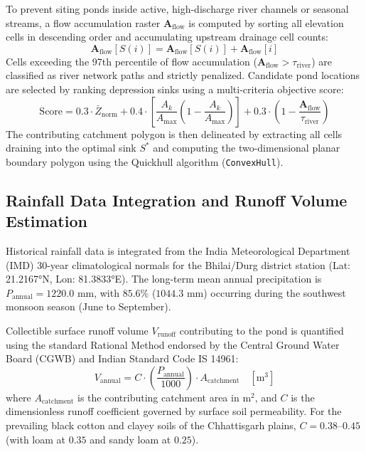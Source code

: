 \documentclass[manuscript,screen,review]{acmart}
\begin{document}
To prevent siting ponds inside active, high-discharge river channels or seasonal streams, a flow accumulation raster $\mathbf{A}_{\text{flow}}$ is computed by sorting all elevation cells in descending order and accumulating upstream drainage cell counts:
\begin{equation}
    \mathbf{A}_{\text{flow}}[S(i)] = \mathbf{A}_{\text{flow}}[S(i)] + \mathbf{A}_{\text{flow}}[i]
\end{equation}
Cells exceeding the 97th percentile of flow accumulation ($\mathbf{A}_{\text{flow}} > \tau_{\text{river}}$) are classified as river network paths and strictly penalized. Candidate pond locations are selected by ranking depression sinks using a multi-criteria objective score:
\begin{equation}
    \text{Score} = 0.3 \cdot \bar{Z}_{\text{norm}} + 0.4 \cdot \left[ \frac{A_k}{A_{\max}} \left(1 - \frac{A_k}{A_{\max}}\right) \right] + 0.3 \cdot \left( 1 - \frac{\mathbf{A}_{\text{flow}}}{\tau_{\text{river}}} \right)
\end{equation}
The contributing catchment polygon is then delineated by extracting all cells draining into the optimal sink $S^*$ and computing the two-dimensional planar boundary polygon using the Quickhull algorithm (\texttt{ConvexHull}).

\subsection{Rainfall Data Integration and Runoff Volume Estimation}
Historical rainfall data is integrated from the India Meteorological Department (IMD) 30-year climatological normals for the Bhilai/Durg district station (Lat: 21.2167°N, Lon: 81.3833°E). The long-term mean annual precipitation is $P_{\text{annual}} = 1220.0\text{ mm}$, with $85.6\%$ ($1044.3\text{ mm}$) occurring during the southwest monsoon season (June to September). 

Collectible surface runoff volume $V_{\text{runoff}}$ contributing to the pond is quantified using the standard Rational Method endorsed by the Central Ground Water Board (CGWB) and Indian Standard Code IS 14961:
\begin{equation}
    V_{\text{annual}} = C \cdot \left( \frac{P_{\text{annual}}}{1000} \right) \cdot A_{\text{catchment}} \quad [\text{m}^3]
\end{equation}
where $A_{\text{catchment}}$ is the contributing catchment area in $\text{m}^2$, and $C$ is the dimensionless runoff coefficient governed by surface soil permeability. For the prevailing black cotton and clayey soils of the Chhattisgarh plains, $C = 0.38\text{--}0.45$ (with loam at $0.35$ and sandy loam at $0.25$).
\end{document}

